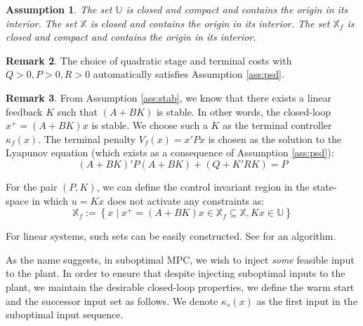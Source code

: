 \documentclass[10pt]{article}
\newcommand{\set}[1]{\left\lbrace #1 \right\rbrace}
\newtheorem{assumption}{Assumption}
\theoremstyle{definition}
\newtheorem{remark}[assumption]{Remark}
\begin{document}
\begin{assumption}
\label{ass:closed}
The set $\mathbb{U}$ is closed and compact and contains the origin in
its interior. The set $\mathbb{X}$ is closed and contains the origin
in its interior. The set $\mathbb{X}_f$ is closed and compact and
contains the origin in its interior.
\end{assumption}

\begin{remark}
The choice of quadratic stage and terminal costs with $Q > 0, P >0,
R>0$ automatically satisfies Assumption \ref{ass:psd}.
\end{remark} 

\begin{remark}
From Assumption \ref{ass:stab}, we know that there exists a linear
feedback $K$ such that $(A+BK)$ is stable. In other words, the
closed-loop $x^+ = (A+BK)x$ is stable. We choose such a $K$ as the
terminal controller $\kappa_f(x)$. The terminal penalty $V_f(x) =
x'Px$ is chosen as 
the solution to the Lyapunov equation (which exists as a consequence
of Assumption \ref{ass:psd}):
\[ (A+BK)'P(A+BK) + (Q+K'RK) = P \]

For the pair $(P,K)$, we can define the control invariant region in
the state-space in which $u=Kx$ does not activate any constraints as:
\[ \mathbb{X}_f := \set{x \mid x^+= (A+BK)x \in \mathbb{X}_f \subseteq
  \mathbb{X}, Kx \in \mathbb{U}}
\]

For linear systems, such sets can be easily constructed. See
\citet{gilbert:tan:1991} for an algorithm. 
\end{remark}

As the name suggests, in suboptimal MPC, we wish to inject {\emph{some}} feasible input
to the plant. In order to ensure that despite injecting suboptimal
inputs to the plant, we maintain the desirable closed-loop properties,
we define the warm start and the successor input set as follows. We
denote $\kappa_s(x)$ as the first input in the suboptimal input
sequence.
\end{document}
